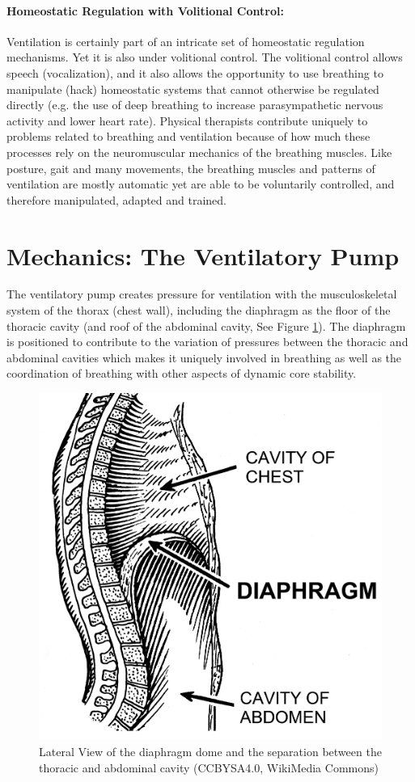 \paragraph{Homeostatic Regulation with Volitional Control:} Ventilation is certainly part of an intricate set of homeostatic regulation mechanisms. Yet it is also under volitional control. The volitional control allows speech (vocalization), and it also allows the opportunity to use breathing to manipulate (hack) homeostatic systems that cannot otherwise be regulated directly (e.g. the use of deep breathing to increase parasympathetic nervous activity and lower heart rate). Physical therapists contribute uniquely to problems related to breathing and ventilation because of how much these processes rely on the neuromuscular mechanics of the breathing muscles. Like posture, gait and many movements, the breathing muscles and patterns of ventilation are mostly automatic yet are able to be voluntarily controlled, and therefore manipulated, adapted and trained.


\section{Mechanics: The Ventilatory Pump}

The ventilatory pump creates pressure for ventilation with the musculoskeletal system of the thorax (chest wall), including the diaphragm as the floor of the thoracic cavity (and roof of the abdominal cavity, See Figure \ref{fig:diaphragm_lateral}). The diaphragm is positioned to contribute to the variation of pressures between the thoracic and abdominal cavities which makes it uniquely involved in breathing as well as the coordination of breathing with other aspects of dynamic core stability. 

\begin{figure}[!h]
    \centering
    \includegraphics[width=0.5 \linewidth]{./figure/ventilation/diaphragm_lateral.png}
    \caption{Lateral View of the diaphragm dome and the separation between the thoracic and abdominal cavity \footnotesize{(CCBYSA4.0, WikiMedia Commons)}}
    \label{fig:diaphragm_lateral}
\end{figure}

